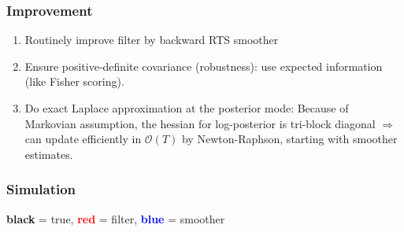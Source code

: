 \documentclass{beamer}
\begin{document}
	
	\begin{frame}
		\frametitle{Improvement}
		\begin{enumerate}
			\item
			Routinely improve filter by backward RTS smoother
			\item
			Ensure positive-definite covariance (robustness): use expected information (like Fisher scoring).
			\item
			Do exact Laplace approximation at the posterior mode: Because of Markovian assumption, the hessian for log-posterior is tri-block diagonal $\Rightarrow$ can update efficiently in $\mathcal{O}(T)$ by Newton-Raphson, starting with smoother estimates.
		\end{enumerate}
	\end{frame}
	
	\begin{frame}
		\frametitle{Simulation}
		\begin{figure}
		\end{figure}
	\centerline{\textbf{black} = true, \textbf{\textcolor{red}{red}} = filter, \textbf{\textcolor{blue}{blue}} = smoother}
	\end{frame}
	
\end{document}
